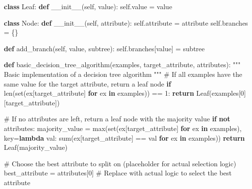 \documentclass[
  letterpaper,
  DIV=11,
  numbers=noendperiod]{scrreprt}
\newenvironment{Shaded}{\begin{snugshade}}{\end{snugshade}}
\newcommand{\BuiltInTok}[1]{\textcolor[rgb]{0.00,0.23,0.31}{#1}}
\newcommand{\CommentTok}[1]{\textcolor[rgb]{0.37,0.37,0.37}{#1}}
\newcommand{\ControlFlowTok}[1]{\textcolor[rgb]{0.00,0.23,0.31}{\textbf{#1}}}
\newcommand{\DecValTok}[1]{\textcolor[rgb]{0.68,0.00,0.00}{#1}}
\newcommand{\FunctionTok}[1]{\textcolor[rgb]{0.28,0.35,0.67}{#1}}
\newcommand{\KeywordTok}[1]{\textcolor[rgb]{0.00,0.23,0.31}{\textbf{#1}}}
\newcommand{\NormalTok}[1]{\textcolor[rgb]{0.00,0.23,0.31}{#1}}
\newcommand{\OperatorTok}[1]{\textcolor[rgb]{0.37,0.37,0.37}{#1}}
\newcommand{\VariableTok}[1]{\textcolor[rgb]{0.07,0.07,0.07}{#1}}
\begin{document}
\begin{Shaded}
\begin{Highlighting}[]
\KeywordTok{class}\NormalTok{ Leaf:}
    \KeywordTok{def} \FunctionTok{\_\_init\_\_}\NormalTok{(}\VariableTok{self}\NormalTok{, value):}
        \VariableTok{self}\NormalTok{.value }\OperatorTok{=}\NormalTok{ value}

\KeywordTok{class}\NormalTok{ Node:}
    \KeywordTok{def} \FunctionTok{\_\_init\_\_}\NormalTok{(}\VariableTok{self}\NormalTok{, attribute):}
        \VariableTok{self}\NormalTok{.attribute }\OperatorTok{=}\NormalTok{ attribute}
        \VariableTok{self}\NormalTok{.branches }\OperatorTok{=}\NormalTok{ \{\}}

    \KeywordTok{def}\NormalTok{ add\_branch(}\VariableTok{self}\NormalTok{, value, subtree):}
        \VariableTok{self}\NormalTok{.branches[value] }\OperatorTok{=}\NormalTok{ subtree}

\KeywordTok{def}\NormalTok{ basic\_decision\_tree\_algorithm(examples, target\_attribute, attributes):}
    \CommentTok{"""}
\CommentTok{    Basic implementation of a decision tree algorithm}
\CommentTok{    """}
    \CommentTok{\# If all examples have the same value for the target attribute, return a leaf node}
    \ControlFlowTok{if} \BuiltInTok{len}\NormalTok{(}\BuiltInTok{set}\NormalTok{(ex[target\_attribute] }\ControlFlowTok{for}\NormalTok{ ex }\KeywordTok{in}\NormalTok{ examples)) }\OperatorTok{==} \DecValTok{1}\NormalTok{:}
        \ControlFlowTok{return}\NormalTok{ Leaf(examples[}\DecValTok{0}\NormalTok{][target\_attribute])}
    
    \CommentTok{\# If no attributes are left, return a leaf node with the majority value}
    \ControlFlowTok{if} \KeywordTok{not}\NormalTok{ attributes:}
\NormalTok{        majority\_value }\OperatorTok{=} \BuiltInTok{max}\NormalTok{(}\BuiltInTok{set}\NormalTok{(ex[target\_attribute] }\ControlFlowTok{for}\NormalTok{ ex }\KeywordTok{in}\NormalTok{ examples), key}\OperatorTok{=}\KeywordTok{lambda}\NormalTok{ val: }\BuiltInTok{sum}\NormalTok{(ex[target\_attribute] }\OperatorTok{==}\NormalTok{ val }\ControlFlowTok{for}\NormalTok{ ex }\KeywordTok{in}\NormalTok{ examples))}
        \ControlFlowTok{return}\NormalTok{ Leaf(majority\_value)}
    
    \CommentTok{\# Choose the best attribute to split on (placeholder for actual selection logic)}
\NormalTok{    best\_attribute }\OperatorTok{=}\NormalTok{ attributes[}\DecValTok{0}\NormalTok{]  }\CommentTok{\# Replace with actual logic to select the best attribute}
    

\end{Highlighting}
\end{Shaded}
\end{document}
